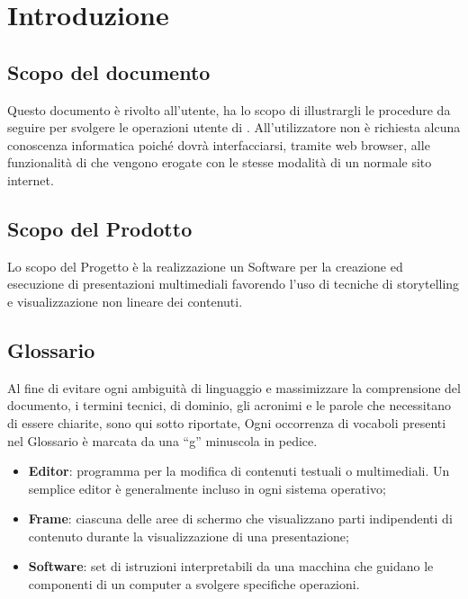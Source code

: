 \section{Introduzione}
\subsection{Scopo del documento}
Questo documento è rivolto all’utente, ha lo scopo di illustrargli le procedure da seguire per svolgere le operazioni utente di \premi . All'utilizzatore non è richiesta alcuna conoscenza informatica poiché dovrà interfacciarsi, tramite web browser, alle funzionalità di \premi che vengono erogate con le stesse modalità di un normale sito internet.
\subsection{Scopo del Prodotto}
Lo scopo del Progetto è la realizzazione un Software per la creazione ed esecuzione di presentazioni multimediali favorendo l’uso di tecniche di storytelling e visualizzazione non lineare dei contenuti.
\subsection{Glossario}
Al fine di evitare ogni ambiguità di linguaggio e massimizzare la comprensione del documento, i termini tecnici, di dominio, gli acronimi e le parole che necessitano di essere chiarite, sono qui sotto riportate, Ogni occorrenza di vocaboli presenti nel Glossario è marcata da una “g” minuscola in pedice.
\begin{itemize}
\item \textbf{Editor}: programma per la modifica di contenuti testuali o multimediali. Un semplice editor è generalmente incluso in ogni sistema operativo;
\item \textbf{Frame}: ciascuna delle aree di schermo che visualizzano parti indipendenti di contenuto durante la visualizzazione di una presentazione;
\item \textbf{Software}: set di istruzioni interpretabili da una macchina che guidano le componenti di un computer a svolgere specifiche operazioni.

\end{itemize}



